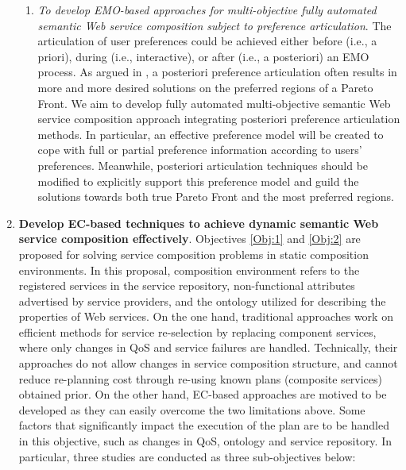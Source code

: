 \begin{enumerate}
\begin{enumerate}
    \item \emph{To develop EMO-based approaches for multi-objective fully automated semantic Web service composition subject to preference articulation}.  The articulation of user preferences could be achieved either before (i.e., a priori), during (i.e., interactive), or after (i.e., a posteriori) an EMO process. As argued in \cite{giagkiozis2014pareto}, a posteriori preference articulation often results in more and more desired solutions on the preferred regions of a Pareto Front. We aim to develop fully automated multi-objective semantic Web service composition approach integrating posteriori preference articulation methods. In particular, an effective preference model will be created to cope with full or partial preference information according to users' preferences. Meanwhile, posteriori articulation techniques should be modified to explicitly support this preference model and guild the solutions towards both true Pareto Front and the most preferred regions. 

   \end{enumerate}
   
\vspace{0.5cm}
 \item \textbf{Develop EC-based techniques to achieve dynamic semantic Web service composition effectively}. Objectives \ref{Obj:1} and \ref{Obj:2} are proposed for solving service composition problems in static composition environments. In this proposal, composition environment refers to the registered services in the service repository, non-functional attributes advertised by service providers, and the ontology utilized for describing the properties of Web services.  On the one hand, traditional approaches \cite{nasridinov2012qos,salas2006ws,wagner2016robust,yin2010qos} work on efficient methods for service re-selection by replacing component services, where only changes in QoS and service failures are handled. Technically, their approaches do not allow changes in service composition structure, and cannot reduce re-planning cost through re-using known plans (composite services) obtained prior. On the other hand, EC-based approaches are motived to be developed as they can easily overcome the two limitations above. Some factors that significantly impact the execution of the plan are to be handled in this objective, such as changes in QoS, ontology and service repository. In particular, three studies are conducted as three sub-objectives below:

 


\end{enumerate}
